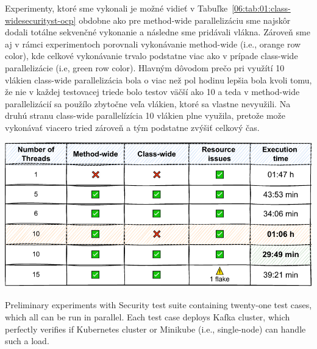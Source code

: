 Experimenty, ktoré sme vykonali je možné vidieť v Tabuľke~\ref{06:tab:01:class-widesecurityst-ocp} obdobne ako pre method-wide
parallelizáciu sme najskôr dodali totálne sekvenčné vykonanie a následne sme pridávali vlákna.
Zároveň sme aj v rámci experimentoch porovnali vykonávanie method-wide (i.e., orange row color), kde celkové vykonávanie trvalo
podstatne viac ako v prípade class-wide parallelizácie (i.e, green row color).
Hlavným dôvodom prečo pri využítí 10 vlákien class-wide parallelizácia bola o viac než pol hodinu lepšia bola kvoli tomu, že
nie v každej testovacej triede bolo testov väčší ako 10 a teda v method-wide parallelizácií sa použílo zbytočne veľa vlákien,
ktoré sa vlastne nevyužili.
Na druhú stranu class-wide parallelízícia 10 vlákien plne využila, pretože može vykonávať viacero tried zároveň a tým podstatne zvýšiť celkový čas.


\begin{table}[ht!]
    \centering
    \includegraphics[scale=0.8]{obrazky-figures/08-experiments/06-exp-preliminary-cluster-wide-ocp}
    \caption{Preliminary experiments with Security test suite containing twenty-one test cases, which all can be run in parallel.
    Each test case deploys Kafka cluster, which perfectly verifies if Kubernetes cluster or Minikube (i.e., single-node) can handle such a load.}
    \label{06:tab:01:class-widesecurityst-ocp}
\end{table}


